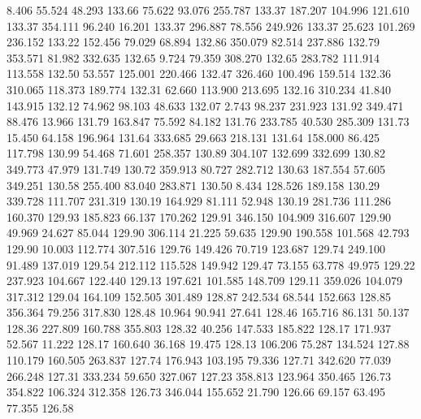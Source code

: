    8.406   55.524   48.293       133.66
  75.622   93.076  255.787       133.37
 187.207  104.996  121.610       133.37
 354.111   96.240   16.201       133.37
 296.887   78.556  249.926       133.37
  25.623  101.269  236.152       133.22
 152.456   79.029   68.894       132.86
 350.079   82.514  237.886       132.79
 353.571   81.982  332.635       132.65
   9.724   79.359  308.270       132.65
 283.782  111.914  113.558       132.50
  53.557  125.001  220.466       132.47
 326.460  100.496  159.514       132.36
 310.065  118.373  189.774       132.31
  62.660  113.900  213.695       132.16
 310.234   41.840  143.915       132.12
  74.962   98.103   48.633       132.07
   2.743   98.237  231.923       131.92
 349.471   88.476   13.966       131.79
 163.847   75.592   84.182       131.76
 233.785   40.530  285.309       131.73
  15.450   64.158  196.964       131.64
 333.685   29.663  218.131       131.64
 158.000   86.425  117.798       130.99
  54.468   71.601  258.357       130.89
 304.107  132.699  332.699       130.82
 349.773   47.979  131.749       130.72
 359.913   80.727  282.712       130.63
 187.554   57.605  349.251       130.58
 255.400   83.040  283.871       130.50
   8.434  128.526  189.158       130.29
 339.728  111.707  231.319       130.19
 164.929   81.111   52.948       130.19
 281.736  111.286  160.370       129.93
 185.823   66.137  170.262       129.91
 346.150  104.909  316.607       129.90
  49.969   24.627   85.044       129.90
 306.114   21.225   59.635       129.90
 190.558  101.568   42.793       129.90
  10.003  112.774  307.516       129.76
 149.426   70.719  123.687       129.74
 249.100   91.489  137.019       129.54
 212.112  115.528  149.942       129.47
  73.155   63.778   49.975       129.22
 237.923  104.667  122.440       129.13
 197.621  101.585  148.709       129.11
 359.026  104.079  317.312       129.04
 164.109  152.505  301.489       128.87
 242.534   68.544  152.663       128.85
 356.364   79.256  317.830       128.48
  10.964   90.941   27.641       128.46
 165.716   86.131   50.137       128.36
 227.809  160.788  355.803       128.32
  40.256  147.533  185.822       128.17
 171.937   52.567   11.222       128.17
 160.640   36.168   19.475       128.13
 106.206   75.287  134.524       127.88
 110.179  160.505  263.837       127.74
 176.943  103.195   79.336       127.71
 342.620   77.039  266.248       127.31
 333.234   59.650  327.067       127.23
 358.813  123.964  350.465       126.73
 354.822  106.324  312.358       126.73
 346.044  155.652   21.790       126.66
  69.157   63.495   77.355       126.58
